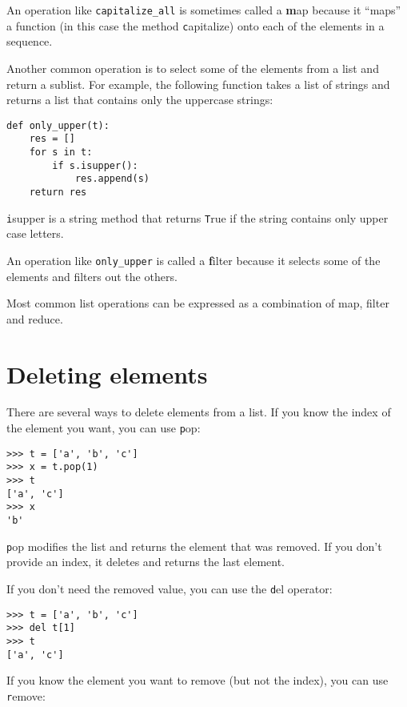 \documentclass[
DIV=11,
fontsize=13,
twoside,
headinclude=false,
titlepage=firstiscover,
abstract=true,
headsepline=true,
footsepline=true,
chapterprefix=true, %
headings=big,
bibliography=totoc,%
captions=tableheading
]{scrbook}
\theoremstyle{definition}
\begin{document}
An operation like \verb"capitalize_all" is sometimes called a {\textbf
map} because it ``maps'' a function (in this case the method {\texttt
capitalize}) onto each of the elements in a sequence.

Another common operation is to select some of the elements from
a list and return a sublist.  For example, the following
function takes a list of strings and returns a list that contains
only the uppercase strings:

\begin{lstlisting}
def only_upper(t):
    res = []
    for s in t:
        if s.isupper():
            res.append(s)
    return res
\end{lstlisting}
%
{\texttt isupper} is a string method that returns {\texttt True} if
the string contains only upper case letters.

An operation like \verb"only_upper" is called a {\textbf filter} because
it selects some of the elements and filters out the others.

Most common list operations can be expressed as a combination
of map, filter and reduce.


\section{Deleting elements}

There are several ways to delete elements from a list.  If you
know the index of the element you want, you can use
{\texttt pop}:

\begin{lstlisting}
>>> t = ['a', 'b', 'c']
>>> x = t.pop(1)
>>> t
['a', 'c']
>>> x
'b'
\end{lstlisting}
%
{\texttt pop} modifies the list and returns the element that was removed.
If you don't provide an index, it deletes and returns the
last element.

If you don't need the removed value, you can use the {\texttt del}
operator:

\begin{lstlisting}
>>> t = ['a', 'b', 'c']
>>> del t[1]
>>> t
['a', 'c']
\end{lstlisting}
%
If you know the element you want to remove (but not the index), you
can use {\texttt remove}:
\end{document}
